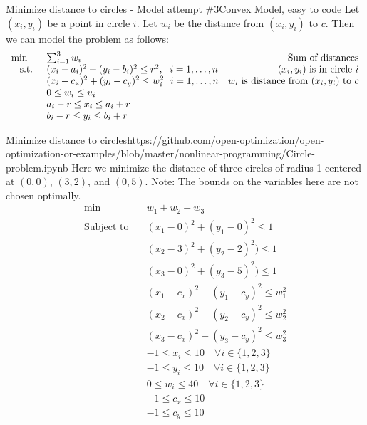\begin{general}{Minimize distance to circles - Model attempt $\#3$}{Convex Model, easy to code}
Let $(x_i,y_i)$ be a point in circle $i$.  Let $w_i$ be the distance from $(x_i, y_i)$ to $c$.  Then we can  model the problem as follows:
\begin{equation}
\begin{array}{rlr}
\min \quad & \sum_{i=1}^3 w_i \hfill & \text{ Sum of distances}\\
\text{ s.t. } & (x_i - a_i)^2  + (y_i - b_i)^2  \leq r^2 , \ \ i=1,\dots, n& \text{ $(x_i, y_i)$ is in circle $i$}\\
& (x_i - c_x)^2 + (y_i - c_y)^2\leq w_i^2 \ \ i=1, \dots, n & \text{$w_i$ is distance from $(x_i, y_i)$ to $c$}\\
& 0 \leq w_i \leq u_i\\
& a_i - r \leq x_i \leq a_i + r\\
& b_i -r \leq y_i \leq b_i + r\\
\end{array}
\end{equation}
\end{general}

\begin{examplewithcode}{Minimize distance to circles}{https://github.com/open-optimization/open-optimization-or-examples/blob/master/nonlinear-programming/Circle-problem.ipynb}
Here we minimize the distance of three circles of radius 1 centered at $(0,0)$, $(3,2)$, and $(0,5)$.  
Note: The bounds on the variables here are not chosen optimally. 
\begin{align*}\min\quad & w_{1} + w_{2} + w_{3}\\
\text{Subject to} \quad & (x_{1} - 0) ^ 2 + (y_{1} - 0)^ 2  \leq 1\\
 & (x_{2} - 3) ^ 2 + (y_{2} - 2) ^ 2)  \leq 1\\
 & (x_{3} - 0) ^ 2 + (y_{3} - 5) ^ 2)  \leq 1\\
 & (x_{1} - c_x) ^ 2 + (y_{1} - c_y) ^ 2\leq w_{1}^ 2\\
 & (x_{2} - c_x) ^ 2 + (y_{2} - c_y) ^ 2\leq w_{2}^ 2\\
 & (x_{3} - c_x) ^ 2 + (y_{3} - c_y) ^ 2\leq w_{3}^ 2\\
 & -1 \leq x_{i} \leq 10 \quad\forall i \in \{1,2,3\}\\
 & -1 \leq y_{i} \leq 10 \quad\forall i \in \{1,2,3\}\\
 & 0 \leq w_{i} \leq 40 \quad\forall i \in \{1,2,3\}\\
 & -1 \leq c_x \leq 10\\
 & -1 \leq c_y \leq 10\\
\end{align*}
\end{examplewithcode}




